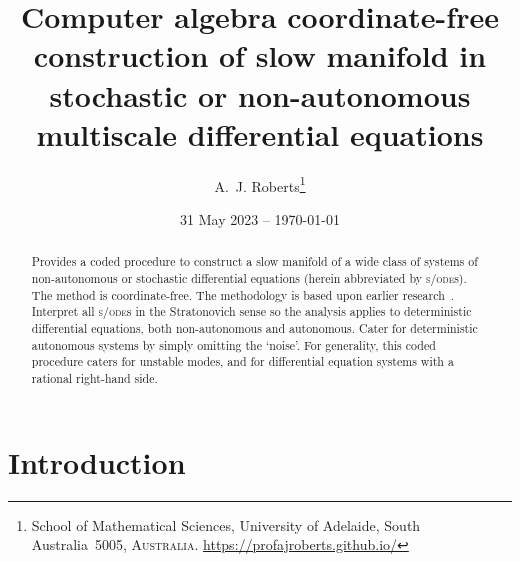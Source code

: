\documentclass[11pt,a5paper]{article}
\title{Computer algebra coordinate-free construction of slow
manifold in stochastic or non-autonomous multiscale
differential equations}
\author{A.~J. Roberts\thanks{School of Mathematical
Sciences, University of Adelaide, South Australia~5005,
\textsc{Australia}. \url{https://profajroberts.github.io/}}}
\date{31 May 2023 -- \today}
\def\sde{\textsc{s/ode}}
\begin{document}
\sloppy

\maketitle

\begin{abstract}
Provides a coded procedure to construct a slow manifold of a
wide class of systems of non-autonomous or stochastic
differential equations (herein abbreviated by \sde{}s).  The
method is coordinate-free.  The methodology is based upon
earlier research~\cite[]{Coullet83, Cox91, Roberts96a,
Chao95, Roberts06k}.  Interpret all \sde{}s in the
Stratonovich sense so the analysis applies to deterministic
differential equations, both non-autonomous and autonomous.
Cater for deterministic autonomous systems by simply
omitting the `noise'.  For generality, this coded procedure
caters for unstable modes, and for differential equation
systems with  a rational right-hand side.  
\end{abstract}

\tableofcontents



\section{Introduction}

%
\end{document}
